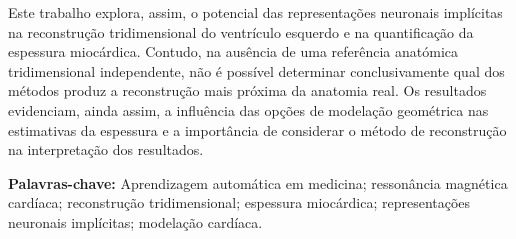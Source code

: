 Este trabalho explora, assim, o potencial das representações neuronais
implícitas na reconstrução tridimensional do ventrículo esquerdo e
na quantificação da espessura miocárdica. Contudo, na ausência de
uma referência anatómica tridimensional independente, não é possível
determinar conclusivamente qual dos métodos produz a reconstrução
mais próxima da anatomia real. Os resultados evidenciam, ainda assim,
a influência das opções de modelação geométrica nas estimativas
da espessura e a importância de considerar o método de reconstrução
na interpretação dos resultados.

\vspace{1em}
\noindent\textbf{Palavras-chave:} Aprendizagem automática em medicina;
ressonância magnética cardíaca; reconstrução tridimensional; espessura
miocárdica; representações neuronais implícitas; modelação cardíaca.

\clearpage
